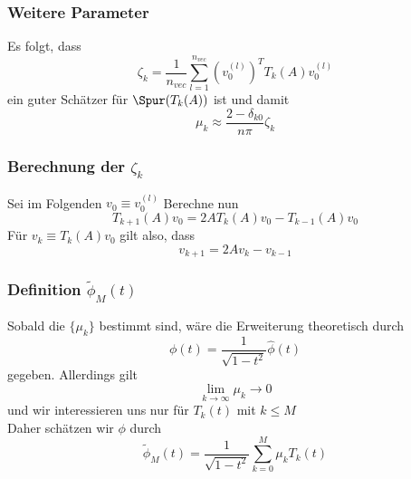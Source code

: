 \begin{frame}
    \frametitle{Weitere Parameter}
    Es folgt, dass
    $$\zeta_k = \frac{1}{n_{vec}} \sum_{l = 1}^{n_{vec}} \left( v_0^{(l)} \right)^T T_k(A) v_0^{(l)}$$
    ein guter Schätzer für $\Spur(T_k(A))$ ist und damit
    $$\mu_k \approx \frac{2 - \delta_{k0}}{n \pi} \zeta_k$$
\end{frame}

\begin{frame}
    \frametitle{Berechnung der $\zeta_k$}
    Sei im Folgenden $v_0 \equiv v_0^{(l)}$
    Berechne nun
    $$T_{k + 1}(A)v_0 = 2 A T_k(A) v_0 - T_{k - 1}(A) v_0$$
    Für $v_k \equiv T_k(A)v_0$ gilt also, dass
    $$v_{k + 1} = 2 A v_k - v_{k - 1}$$
\end{frame}

\begin{frame}
    \frametitle{Definition $\tilde{\phi}_M(t)$}
    Sobald die $\{ \mu_k \}$ bestimmt sind, wäre die Erweiterung theoretisch durch
    $$\phi(t) = \frac{1}{\sqrt{1 - t^2}} \hat{\phi}(t)$$
    gegeben. Allerdings gilt
    $$\lim \limits_{k \to \infty} \mu_k \to 0$$
    und wir interessieren uns nur für $T_k(t)$ mit $k \leq M$\\
    Daher schätzen wir $\phi$ durch
    $$\tilde{\phi}_M(t) = \frac{1}{\sqrt{1 - t^2}} \sum_{k = 0}^{M} \mu_k T_k(t)$$
\end{frame}